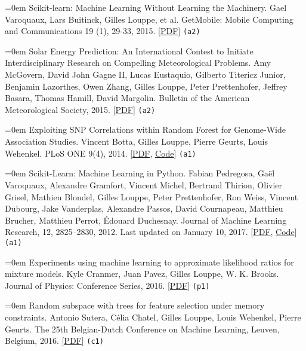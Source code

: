 \documentclass{scrartcl}
\newcommand{\MarginText}[1]{\marginpar{\raggedleft\itshape\small#1}}
\newcommand{\NewPublication}[4]{\noindent\hangindent=0em\hangafter=0 \MarginText{\color{black} #1}{\footnotesize [{\color{Maroon}#2}]} #3 {\footnotesize\color{gray}#4}\vspace{0.5em}}
\begin{document}
\begin{cv}{}
\NewPublication{}{4}{Scikit-learn: Machine Learning Without Learning the Machinery.}{%
Gael Varoquaux, Lars Buitinck, Gilles Louppe, et al.
GetMobile: Mobile Computing and Communications 19 (1), 29-33, 2015.
[\href{https://dl.acm.org/citation.cfm?id=2786995}{PDF}]
{\color{black}\tt (a2)}}

\NewPublication{}{3}{Solar Energy Prediction: An International Contest to Initiate Interdisciplinary Research on Compelling Meteorological Problems.}{%
Amy McGovern, David John Gagne II, Lucas Eustaquio, Gilberto Titericz Junior, Benjamin Lazorthes, Owen Zhang, Gilles Louppe, Peter Prettenhofer, Jeffrey Basara, Thomas Hamill, David Margolin.
Bulletin of the American Meteorological Society, 2015.
[\href{http://hdl.handle.net/2268/177115}{PDF}]
{\color{black}\tt (a2)}}

\NewPublication{}{2}{Exploiting SNP Correlations within Random Forest for Genome-Wide Association Studies.}{%
Vincent Botta, Gilles Louppe, Pierre Geurts, Louis Wehenkel.
PLoS ONE 9(4), 2014.
[\href{http://dx.plos.org/10.1371/journal.pone.0093379}{PDF}, \href{https://github.com/0asa/TTree-source}{Code}]
{\color{black}\tt (a1)}}

\NewPublication{}{1}{Scikit-Learn: Machine Learning in Python.}{%
Fabian Pedregosa, Ga\"el Varoquaux, Alexandre Gramfort, Vincent Michel, Bertrand Thirion, Olivier Grisel, Mathieu Blondel, Gilles Louppe, Peter Prettenhofer, Ron Weiss, Vincent Dubourg, Jake Vanderplas, Alexandre Passos, David Cournapeau, Matthieu Brucher, Matthieu Perrot, \'Edouard Duchesnay.
Journal of Machine Learning Research, 12, 2825--2830, 2012.
Last updated on January 10, 2017.
[\href{https://arxiv.org/abs/1201.0490}{PDF}, \href{https://http://scikit-learn.org}{Code}]
{\color{black}\tt (a1)}}



\NewPublication{in conference proceedings}{13}{Experiments using machine learning to approximate likelihood ratios for mixture models.}{%
Kyle Cranmer, Juan Pavez, Gilles Louppe, W. K. Brooks.
Journal of Physics: Conference Series, 2016.
[\href{http://iopscience.iop.org/article/10.1088/1742-6596/762/1/012034/pdf}{PDF}]
{\color{black}\tt (p1)}}

\NewPublication{}{12}{Random subspace with trees for feature selection under memory constraints.}{%
Antonio Sutera, C\'elia Chatel, Gilles Louppe, Louis Wehenkel, Pierre Geurts.
The 25th Belgian-Dutch Conference on Machine Learning, Leuven, Belgium, 2016.
[\href{http://hdl.handle.net/2268/202206}{PDF}]
{\color{black}\tt (c1)}}


\end{cv}
\end{document}

